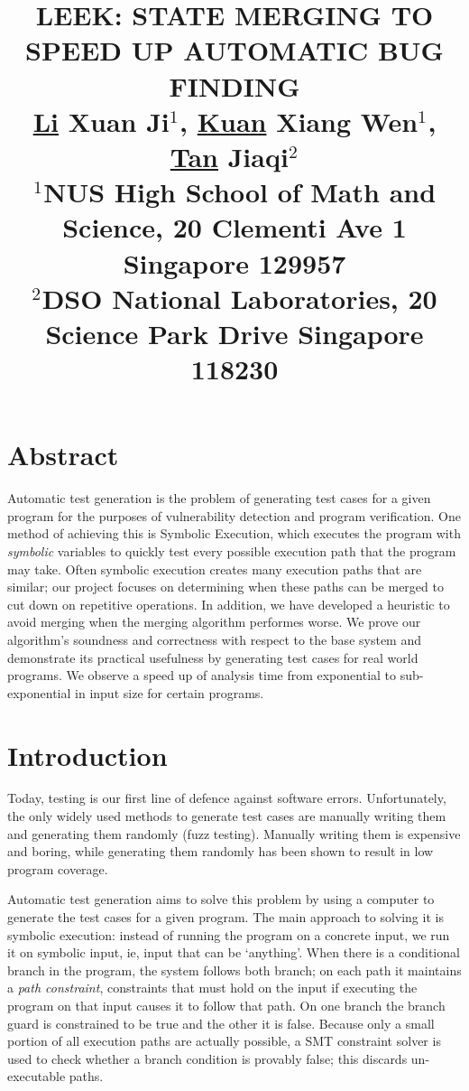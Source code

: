 \documentclass[12pt,a4paper]{article}
\title{\textbf{\textsc{\large{LEEK: STATE MERGING TO SPEED UP AUTOMATIC BUG FINDING}}}\\
\vspace{2mm}
\small{\underline{Li} Xuan Ji$^{1}$, \underline{Kuan} Xiang Wen$^{1}$, \underline{Tan} Jiaqi$^{2}$\\
$^{1}$NUS High School of Math and Science, 20 Clementi Ave 1 Singapore 129957\\
$^{2}$DSO National Laboratories, 20 Science Park Drive Singapore 118230
}}
\date{}
\begin{document}
\maketitle

\section*{Abstract}
Automatic test generation is the problem of generating test cases for a given program for the purposes of vulnerability detection and program verification. One method of achieving this is Symbolic Execution, which executes the program with \emph{symbolic} variables to quickly test every possible execution path that the program may take. Often symbolic execution creates many execution paths that are similar; our project focuses on determining when these paths can be merged to cut down on repetitive operations. In addition, we have developed a heuristic to avoid merging when the merging algorithm performes worse. We prove our algorithm's soundness and correctness with respect to the base system and demonstrate its practical usefulness by generating test cases for real world programs. We observe a speed up of analysis time from exponential to sub-exponential in input size for certain programs.

\section*{Introduction}
Today, testing is our first line of defence against software errors. Unfortunately, the only widely used methods to generate test cases are manually writing them and generating them randomly (fuzz testing). Manually writing them is expensive and boring, while generating them randomly has been shown to result in low program coverage. 

Automatic test generation aims to solve this problem by using a computer to generate the test cases for a given program. The main approach to solving it is symbolic execution: instead of running the program on a concrete input, we run it on symbolic input, ie, input that can be `anything'. When there is a conditional branch in the program, the system follows both branch; on each path it maintains a \emph{path constraint}, constraints that must hold on the input if executing the program on that input causes it to follow that path. On one branch the branch guard is constrained to be true and the other it is false. Because only a small portion of all execution paths are actually possible, a SMT constraint solver is used to check whether a branch condition is provably false; this discards un-executable paths.
\end{document}
